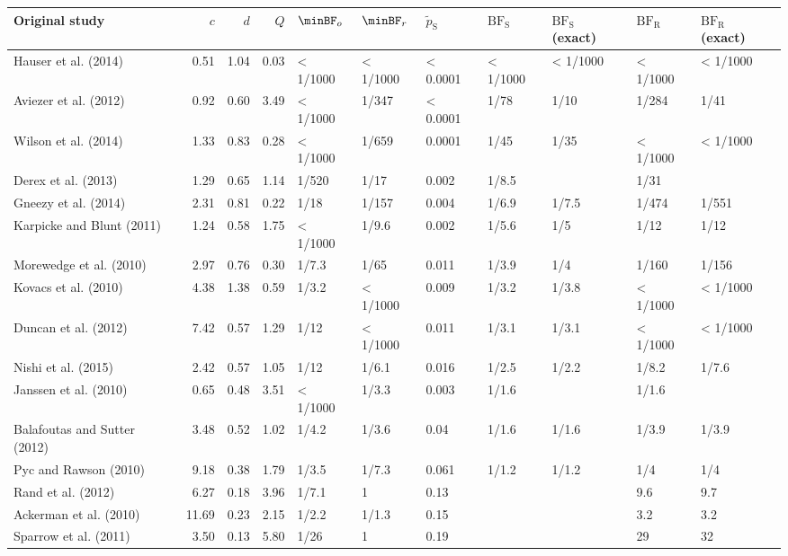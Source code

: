 \begin{landscape}
\begin{table}[!htb]
{\small
\begin{tabular}{lrrrlllllll}
  \toprule
Original study & $c$ & $d$ & $Q$ & $\minBF_o$ & $\minBF_r$ & $\tilde{p}_{\mathrm{S}}$ & $\mathrm{BF}_{\mathrm{S}}$ & $\mathrm{BF}_{\mathrm{S}}$ (exact) & $\mathrm{BF}_{\mathrm{R}}$ & $\mathrm{BF}_{\mathrm{R}}$ (exact) \\
  \midrule
Hauser et al. (2014) & 0.51 & 1.04 & 0.03 & < 1/1000 & < 1/1000 & < 0.0001 & < 1/1000 & < 1/1000 & < 1/1000 & < 1/1000 \\
  Aviezer et al. (2012) & 0.92 & 0.60 & 3.49 & < 1/1000 & 1/347 & < 0.0001 & 1/78 & 1/10 & 1/284 & 1/41 \\
  Wilson et al. (2014) & 1.33 & 0.83 & 0.28 & < 1/1000 & 1/659 & 0.0001 & 1/45 & 1/35 & < 1/1000 & < 1/1000 \\
  Derex et al. (2013) & 1.29 & 0.65 & 1.14 & 1/520 & 1/17 & 0.002 & 1/8.5 &  & 1/31 &  \\
  Gneezy et al. (2014) & 2.31 & 0.81 & 0.22 & 1/18 & 1/157 & 0.004 & 1/6.9 & 1/7.5 & 1/474 & 1/551 \\
  Karpicke and Blunt (2011) & 1.24 & 0.58 & 1.75 & < 1/1000 & 1/9.6 & 0.002 & 1/5.6 & 1/5 & 1/12 & 1/12 \\
  Morewedge et al. (2010) & 2.97 & 0.76 & 0.30 & 1/7.3 & 1/65 & 0.011 & 1/3.9 & 1/4 & 1/160 & 1/156 \\
  Kovacs et al. (2010) & 4.38 & 1.38 & 0.59 & 1/3.2 & < 1/1000 & 0.009 & 1/3.2 & 1/3.8 & < 1/1000 & < 1/1000 \\
  Duncan et al. (2012) & 7.42 & 0.57 & 1.29 & 1/12 & < 1/1000 & 0.011 & 1/3.1 & 1/3.1 & < 1/1000 & < 1/1000 \\
  Nishi et al. (2015) & 2.42 & 0.57 & 1.05 & 1/12 & 1/6.1 & 0.016 & 1/2.5 & 1/2.2 & 1/8.2 & 1/7.6 \\
  Janssen et al. (2010) & 0.65 & 0.48 & 3.51 & < 1/1000 & 1/3.3 & 0.003 & 1/1.6 &  & 1/1.6 &  \\
  Balafoutas and Sutter (2012) & 3.48 & 0.52 & 1.02 & 1/4.2 & 1/3.6 & 0.04 & 1/1.6 & 1/1.6 & 1/3.9 & 1/3.9 \\
  Pyc and Rawson (2010) & 9.18 & 0.38 & 1.79 & 1/3.5 & 1/7.3 & 0.061 & 1/1.2 & 1/1.2 & 1/4 & 1/4 \\
  Rand et al. (2012) & 6.27 & 0.18 & 3.96 & 1/7.1 & 1 & 0.13 &  &  & 9.6 & 9.7 \\
  Ackerman et al. (2010) & 11.69 & 0.23 & 2.15 & 1/2.2 & 1/1.3 & 0.15 &  &  & 3.2 & 3.2 \\
  Sparrow et al. (2011) & 3.50 & 0.13 & 5.80 & 1/26 & 1 & 0.19 &  &  & 29 & 32 \\

\end{tabular}}
\end{table}
\end{landscape}
